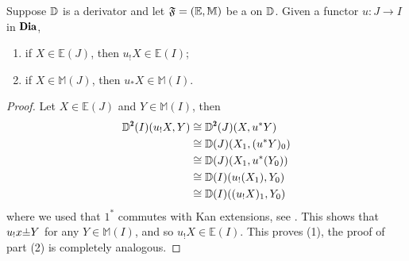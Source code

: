 \begin{lemma}\label{cfs_limit_colimit}
Suppose $\mathbb{D}$ is a derivator and let $\mathfrak{F}=(\mathbb E,\mathbb M)$ be a \cpfs on $\mathbb{D}$. Given a functor $u\colon J\to I$ in $\Dia$, 
\begin{enumerate}
\item if $X\in \mathbb E(J)$, then $u_!X\in \mathbb E(I)$;
\item if $X\in \mathbb M(J)$, then $u_*X\in \mathbb M(I)$.
\end{enumerate}
\end{lemma}
\begin{proof}
Let $X\in \mathbb E(J)$ and $Y\in \mathbb M(I)$, then
\begin{align*}\D^\due(I)(u_!X,Y)&\cong \D^\due(J)(X,u^*Y)\\
&\cong \D(J)(X_1,(u^*Y)_0)\\
&\cong \D(J)(X_1,u^*(Y_0))\\
&\cong \D(I)(u_!(X_1),Y_0)\\
&\cong \D(I)((u_!X)_1,Y_0)
\end{align*}
where we used that $1^*$ commutes with Kan extensions, see \cite[\aprop\textbf{2.6}]{Moritz}. This shows that $u_!x{\corth }Y$ for any $Y\in\mathbb M(I)$, and so $u_!X\in \mathbb E(I)$. This proves (1), the proof of part (2) is completely analogous.
\end{proof}







